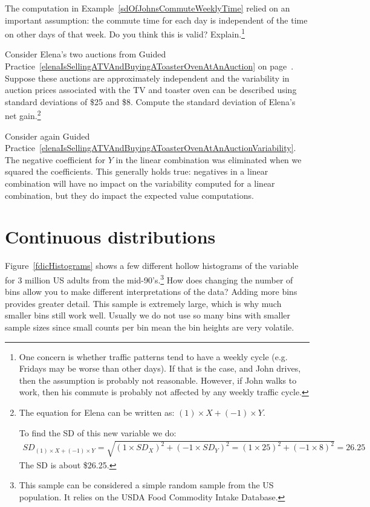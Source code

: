 \begin{exercise}
The computation in Example~\ref{sdOfJohnsCommuteWeeklyTime} relied on an important assumption: the commute time for each day is independent of the time on other days of that week. Do you think this is valid? Explain.\footnote{One concern is whether traffic patterns tend to have a weekly cycle (e.g. Fridays may be worse than other days). If that is the case, and John drives, then the assumption is probably not reasonable. However, if John walks to work, then his commute is probably not affected by any weekly traffic cycle.}
\end{exercise}

\begin{exercise}\label{elenaIsSellingATVAndBuyingAToasterOvenAtAnAuctionVariability}
Consider Elena's two auctions from Guided Practice~\ref{elenaIsSellingATVAndBuyingAToasterOvenAtAnAuction} on page~\pageref{elenaIsSellingATVAndBuyingAToasterOvenAtAnAuction}. Suppose these auctions are approximately independent and the variability in auction prices associated with the TV and toaster oven can be described using standard deviations of \$25 and \$8. Compute the standard deviation of Elena's net gain.\footnote{The equation for Elena can be written as:  $(1)\times X + (-1)\times Y$.

To find the SD of this new variable we do:
\begin{align*}
SD_{(1)\times X + (-1)\times Y} = \sqrt{(1\times SD_X)^2 + (-1\times SD_Y)^2 = (1\times 25)^2 + (-1\times 8)^2} = 26.25
\end{align*}
The SD is about \$26.25.}
\end{exercise}

Consider again Guided Practice~\ref{elenaIsSellingATVAndBuyingAToasterOvenAtAnAuctionVariability}. The negative coefficient for $Y$ in the linear combination was eliminated when we squared the coefficients. This generally holds true: negatives in a linear combination will have no impact on the variability computed for a linear combination, but they do impact the expected value computations.


\section{Continuous distributions}
\label{contDist}

\begin{example}{Figure~\ref{fdicHistograms} shows a few different hollow histograms of the variable  for 3 million US adults from the mid-90's.\footnote{This sample can be considered a simple random sample from the US population. It relies on the USDA Food Commodity Intake Database.} How does changing the number of bins allow you to make different interpretations of the data?}\label{usHeights}
Adding more bins provides greater detail. This sample is extremely large, which is why much smaller bins still work well. Usually we do not use so many bins with smaller sample sizes since small counts per bin mean the bin heights are very volatile.
\end{example}

